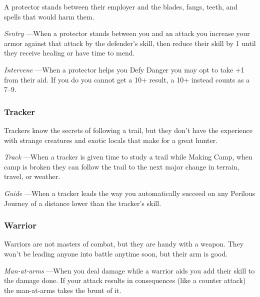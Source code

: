 A protector stands between their employer and the blades, fangs, teeth, and spells that would harm them. 

       

         {\em Sentry} —When a protector stands between you and an attack you increase your armor against that attack by the defender's skill, then reduce their skill by 1 until they receive healing or have time to mend.

       

         {\em Intervene} —When a protector helps you Defy Danger you may opt to take +1 from their aid. If you do you cannot get a 10+ result, a 10+ instead counts as a 7–9.

       
\subsubsection{Tracker}   
       

Trackers know the secrets of following a trail, but they don't have the experience with strange creatures and exotic locals that make for a great hunter.

       

         {\em Track} —When a tracker is given time to study a trail while Making Camp, when camp is broken they can follow the trail to the next major change in terrain, travel, or weather.

       

         {\em Guide} —When a tracker leads the way you automatically succeed on any Perilous Journey of a distance lower than the tracker's skill.

       
\subsubsection{Warrior}   
       

Warriors are not masters of combat, but they are handy with a weapon. They won't be leading anyone into battle anytime soon, but their arm is good.

       

         {\em Man-at-arms} —When you deal damage while a warrior aids you add their skill to the damage done. If your attack results in consequences (like a counter attack) the man-at-arms takes the brunt of it.

                
